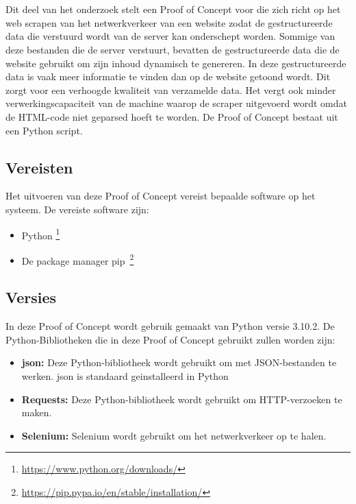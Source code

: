 \chapter{}%
\label{ch:proof-of-concept}

Dit deel van het onderzoek stelt een Proof of Concept voor die zich richt op het web scrapen van het netwerkverkeer van een website zodat de gestructureerde data die verstuurd wordt van de server kan onderschept worden. Sommige van deze bestanden die de server verstuurt, bevatten de gestructureerde data die de website gebruikt om zijn inhoud dynamisch te genereren. In deze gestructureerde data is vaak meer informatie te vinden dan op de website getoond wordt. Dit zorgt voor een verhoogde kwaliteit van verzamelde data. Het vergt ook minder verwerkingscapaciteit van de machine waarop de scraper uitgevoerd wordt omdat de HTML-code niet geparsed hoeft te worden. De Proof of Concept bestaat uit een Python script.

\section{Vereisten}
Het uitvoeren van deze Proof of Concept vereist bepaalde software op het systeem. De vereiste software zijn:
\begin{itemize}
    \item Python \footnote{\url{https://www.python.org/downloads/}}
    \item De package manager pip~\footnote{\url{https://pip.pypa.io/en/stable/installation/}}
\end{itemize}

\section{Versies}
In deze Proof of Concept wordt gebruik gemaakt van Python versie 3.10.2. De Python-Bibliotheken die in deze Proof of Concept gebruikt zullen worden zijn:

\begin{itemize}
    \item \textbf{json: } Deze Python-bibliotheek wordt gebruikt om met JSON-bestanden te werken. json is standaard geinstalleerd in Python

    \item \textbf{Requests: } Deze Python-bibliotheek wordt gebruikt om HTTP-verzoeken te maken.

    \item \textbf{Selenium: } Selenium wordt gebruikt om het netwerkverkeer op te halen.
\end{itemize}

